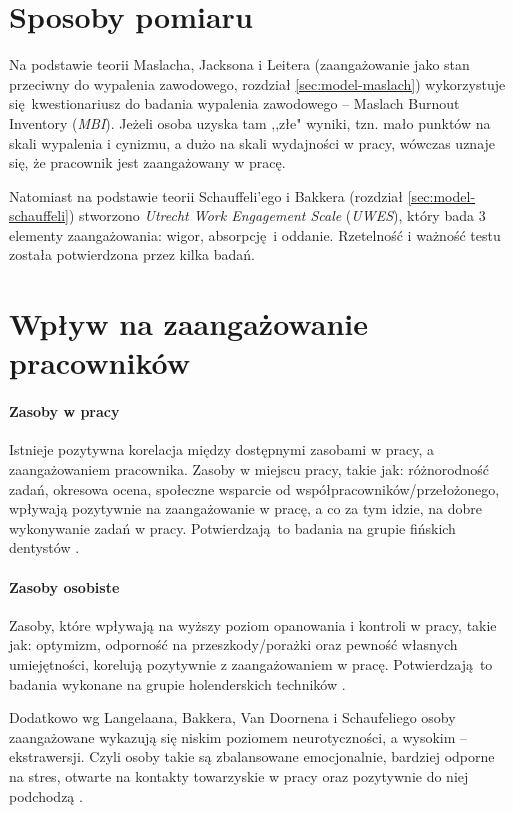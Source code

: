 \section{Sposoby pomiaru}
Na podstawie teorii Maslacha, Jacksona i Leitera (zaangażowanie jako stan przeciwny do wypalenia zawodowego, rozdział \ref{sec:model-maslach}) wykorzystuje się kwestionariusz do badania wypalenia zawodowego -- Maslach Burnout Inventory (\emph{MBI}). Jeżeli osoba uzyska tam ,,złe" wyniki, tzn. mało punktów na skali wypalenia i cynizmu, a dużo na skali wydajności w pracy, wówczas uznaje się, że pracownik jest zaangażowany w pracę.

Natomiast na podstawie teorii Schauffeli'ego i Bakkera (rozdział \ref{sec:model-schauffeli}) stworzono \emph{Utrecht Work Engagement Scale} (\emph{UWES}), który bada 3 elementy zaangażowania: wigor, absorpcję i oddanie. Rzetelność i ważność testu została potwierdzona przez kilka badań.

\section{Wpływ na zaangażowanie pracowników}
\label{sec:theory-eng-infl}
\paragraph{Zasoby w pracy}
Istnieje pozytywna korelacja między dostępnymi zasobami w pracy, a zaangażowaniem pracownika. Zasoby w miejscu pracy, takie jak: różnorodność zadań, okresowa ocena, społeczne wsparcie od współpracowników/przełożonego, wpływają pozytywnie na zaangażowanie w pracę, a co za tym idzie, na dobre wykonywanie zadań w pracy. Potwierdzają to badania na grupie fińskich dentystów \cite{hakanen2008positive}.
\paragraph{Zasoby osobiste}
Zasoby, które wpływają na wyższy poziom opanowania i kontroli w pracy, takie jak: optymizm, odporność na przeszkody/porażki oraz pewność własnych umiejętności, korelują pozytywnie z zaangażowaniem w pracę. Potwierdzają to badania wykonane na grupie holenderskich techników \cite{xanthopoulou2007role}.

Dodatkowo wg Langelaana, Bakkera, Van Doornena i Schaufeliego osoby zaangażowane wykazują się niskim poziomem neurotyczności, a wysokim -- ekstrawersji. Czyli osoby takie są zbalansowane emocjonalnie, bardziej odporne na stres, otwarte na kontakty towarzyskie w pracy oraz pozytywnie do niej podchodzą \cite{langelaan2006burnout}. 

